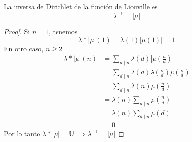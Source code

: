 \documentclass[main.tex]{subfiles}
\begin{document}
\begin{theorem}
La inversa de Dirichlet de la funci\'on de Liouville es
$$\lambda^{-1} = |\mu|$$
\end{theorem}
\begin{proof}
Si $n = 1$, tenemos
$$\lambda * |\mu|(1) = \lambda(1)|\mu(1)| = 1$$
En otro caso, $n \geq 2$
\begin{align*}
    \lambda*|\mu|(n) &= \sum_{d \mid n} \lambda(d)|\mu(\frac{n}{d})|\\
    &= \sum_{d \mid n} \lambda(d)\lambda(\frac{n}{d})\mu(\frac{n}{d})\\
    &= \sum_{d \mid n} \lambda(n)\mu(\frac{n}{d})\\
    &= \lambda(n)\sum_{d \mid n} \mu(\frac{n}{d})\\
    &= \lambda(n)\sum_{d \mid n} \mu(d)\\
    &= 0
\end{align*}
Por lo tanto $\lambda * |\mu| = \mathbb U \implies \lambda^{-1} = |\mu|$
\end{proof}
\end{document}

